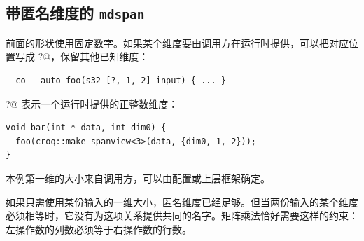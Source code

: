 \subsection*{带匿名维度的 \texttt{mdspan}}

前面的形状使用固定数字。如果某个维度要由调用方在运行时提供，可以把对应位置写成 \co@?@，保留其他已知维度：

\begin{lstlisting}[language=croqtile,caption={含未知维度的核函数}]
__co__ auto foo(s32 [?, 1, 2] input) { ... }
\end{lstlisting}

\co@?@ 表示一个运行时提供的正整数维度：

\begin{lstlisting}[language=croqtile,caption={由调用方提供该维度}]
void bar(int * data, int dim0) {
  foo(croq::make_spanview<3>(data, {dim0, 1, 2}));
}
\end{lstlisting}

本例第一维的大小来自调用方，可以由配置或上层框架确定。

如果只需使用某份输入的一维大小，匿名维度已经足够。但当两份输入的某个维度必须相等时，它没有为这项关系提供共同的名字。矩阵乘法恰好需要这样的约束：左操作数的列数必须等于右操作数的行数。
